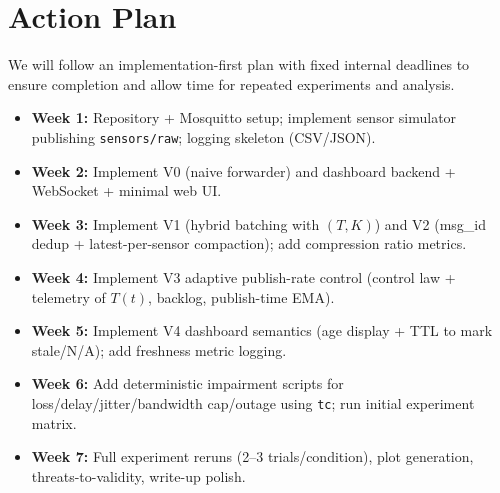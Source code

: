 \section{Action Plan}
\label{sec:action-plan}

We will follow an implementation-first plan with fixed internal deadlines to ensure completion and allow time for repeated experiments and analysis.

\begin{itemize}[leftmargin=*]
  \item \textbf{Week 1:} Repository + Mosquitto setup; implement sensor simulator publishing \texttt{sensors/raw}; logging skeleton (CSV/JSON).
  \item \textbf{Week 2:} Implement V0 (naive forwarder) and dashboard backend + WebSocket + minimal web UI.
  \item \textbf{Week 3:} Implement V1 (hybrid batching with $(T,K)$) and V2 (msg\_id dedup + latest-per-sensor compaction); add compression ratio metrics.
  \item \textbf{Week 4:} Implement V3 adaptive publish-rate control (control law + telemetry of $T(t)$, backlog, publish-time EMA).
  \item \textbf{Week 5:} Implement V4 dashboard semantics (age display + TTL to mark stale/N/A); add freshness metric logging.
  \item \textbf{Week 6:} Add deterministic impairment scripts for loss/delay/jitter/bandwidth cap/outage using \texttt{tc}; run initial experiment matrix.
  \item \textbf{Week 7:} Full experiment reruns (2--3 trials/condition), plot generation, threats-to-validity, write-up polish.
\end{itemize}